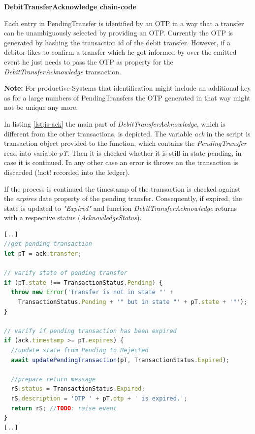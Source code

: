 \textbf{DebitTransferAcknowledge chain-code}

Each entry in PendingTransfer is identified by an OTP in a way that a transfer can be unambiguously selected by providing an OTP. Currently the OTP is generated by hashing the transaction id of the debit transfer. However, if a debitor likes to confirm a transfer which he got informed by over the emitted event he just needs to pass the OTP as property for the \textit{DebitTransferAcknowledge} transaction.

\textbf{Note:} For productive Systems that identification might include an additional key as for a large numbers of PendingTransfers the OTP generated in that way might not be unique any more.

In listing \ref{lst:js-ack} the main part of \textit{DebitTransferAcknowledge}, which is different from the other transactions, is depicted. The variable \textit{ack} in the script is transaction object provided to the function, which contains the \textit{PendingTransfer} read into variable \textit{pT}. Then it is checked whether it is still in state pending, in case it is continued. In any other case an error is throws an the transaction is discarded (!not! recorded into the ledger).

If the process is continued the timestamp of the transaction is checked against the \textit{expires} date property of the pending transfer. Consequently, if expired, the state is updated to \textit{"Expired"} and function \textit{DebitTransferAcknowledge} returns with a respective status (\textit{AcknowledgeStatus}).

\begin{center}
\begin{minipage}{0.8\textwidth}
\small
\begin{lstlisting}[language=javascript,firstnumber=1,caption={\bf\small RequestDebitAcknowledge JavaScript excerpt}, captionpos=b,label=lst:js-ack]
[..]
//get pending transaction
let pT = ack.transfer;

// varify state of pending transfer
if (pT.state !== TransactionStatus.Pending) {
  throw new Error('Transfer is not in state "' +
    TransactionStatus.Pending + '" but in state "' + pT.state + '"');
}

// varify if pending transaction has been expired
if (ack.timestamp >= pT.expires) {
  //update state from Pending to Rejected
  await updatePendingTransaction(pT, TransactionStatus.Expired);

  //prepare return message
  rS.status = TransactionStatus.Expired;
  rS.description = 'OTP ' + pT.otp + ' is expired.';
  return rS; //TODO: raise event
}
[..]
\end{lstlisting}
\end{minipage}
\end{center}

